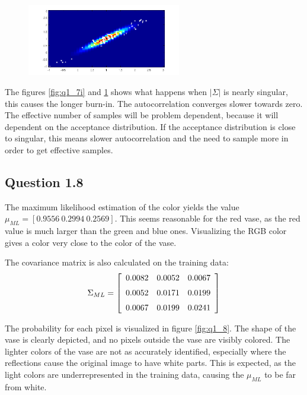 \documentclass[a4paper, 10pt, final]{article}
\begin{document}
\begin{figure}[!htpb]
  \centering
  \includegraphics[width=0.6\textwidth]{images/q1_7j}
  \caption{}
  \label{fig:q1_7j}
\end{figure}

The figures \ref{fig:q1_7i} and \ref{fig:q1_7j} shows what happens when $|\Sigma|$ is nearly singular, this causes the longer burn-in. The autocorrelation converges slower towards zero. The effective number of samples will be problem dependent, because it will dependent on the acceptance distribution. If the acceptance distribution is close to singular, this means slower autocorrelation and the need to sample more in order to get effective samples.

\subsection*{Question 1.8}

The maximum likelihood estimation of the color yields the value $\mu _{ML} = [0.9556~ 0.2994~ 0.2569]$.
This seems reasonable for the red vase, as the red value is much larger than the green and blue ones.
Visualizing the RGB color gives a color very close to the color of the vase.

The covariance matrix is also calculated on the training data:\\
$$\Sigma _{ML} = \left[
\begin {array}{ccc}
0.0082 & 0.0052 & 0.0067\\
\noalign{\medskip}
0.0052 & 0.0171 & 0.0199\\
\noalign{\medskip}
0.0067 & 0.0199 & 0.0241\\
\end {array}
\right]$$

The probability for each pixel is visualized in figure \ref{fig:q1_8}.
The shape of the vase is clearly depicted, and no pixels outside the vase are visibly colored.
The lighter colors of the vase are not as accurately identified, especially where the reflections cause the original image to have white parts.
This is expected, as the light colors are underrepresented in the training data, causing the $\mu _{ML}$ to be far from white.
\end{document}
